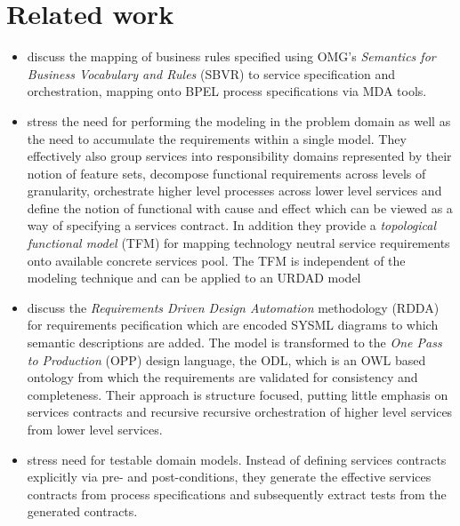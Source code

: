 \section{Related work \label{sec:relatedWork}}

\begin{itemize}
 \item \cite{iacob_model-driven_2008} discuss the mapping of business rules specified using OMG's {\em Semantics for Business Vocabulary and Rules} (SBVR) to service specification and orchestration, mapping onto BPEL process specifications via MDA tools.

  \item \cite{asnina_computation_2010} stress the need for performing the modeling in the problem domain as well as the need to accumulate the requirements within a single model. They effectively also group services into responsibility domains represented by their notion of feature sets, decompose functional requirements across levels of granularity, orchestrate higher level processes across lower level services and define the notion of functional with cause and effect which can be viewed as a way of specifying a services contract. In addition they provide a {\em topological functional model} (TFM) for mapping technology neutral service requirements onto available concrete services pool. The TFM is independent of the modeling technique and can be applied to an URDAD model

  \item \cite{cardei_model_2008} discuss the {\em Requirements Driven Design Automation} methodology (RDDA) for requirements pecification which are encoded SYSML diagrams to which semantic descriptions are added. The model is transformed to the {\em One Pass to Production} (OPP) design language, the ODL, which is an OWL based ontology from which the requirements are validated for consistency and completeness. Their approach is structure focused, putting little emphasis on services contracts and recursive recursive orchestration of higher level services from lower level services.

  \item \cite{bashardoust-tajali_extracting_2008} stress need for testable domain models. Instead of defining services contracts explicitly via pre- and post-conditions, they generate the effective services contracts from process specifications and subsequently extract tests from the generated contracts.






\end{itemize}
